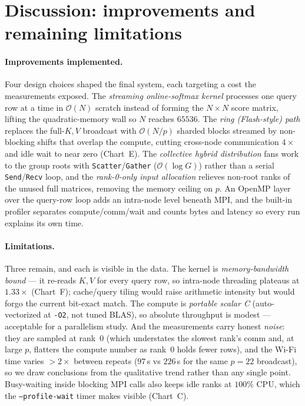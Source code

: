 \documentclass[11pt,a4paper]{article}
\newcommand{\code}[1]{\texttt{#1}}
\begin{document}
\section{Discussion: improvements and remaining limitations}
\label{sec:discussion}
\paragraph{Improvements implemented.} Four design choices shaped the final system,
each targeting a cost the measurements exposed. The \emph{streaming online-softmax
kernel} processes one query row at a time in $\mathcal{O}(N)$ scratch instead of
forming the $N\times N$ score matrix, lifting the quadratic-memory wall so $N$
reaches $65536$. The \emph{ring (Flash-style) path} replaces the full-$K,V$
broadcast with $\mathcal{O}(N/p)$ sharded blocks streamed by non-blocking shifts
that overlap the compute, cutting cross-node communication $4\times$ and idle wait
to near zero (Chart~E). The \emph{collective hybrid distribution} fans work to the
group roots with \code{Scatter}/\code{Gather} ($\mathcal{O}(\log G)$) rather than a
serial \code{Send}/\code{Recv} loop, and the \emph{rank-0-only input allocation}
relieves non-root ranks of the unused full matrices, removing the memory ceiling on
$p$. An OpenMP layer over the query-row loop adds an intra-node level beneath MPI,
and the built-in profiler separates compute/comm/wait and counts bytes and latency
so every run explains its own time.

\paragraph{Limitations.} Three remain, and each is visible in the data. The kernel
is \emph{memory-bandwidth bound} --- it re-reads $K,V$ for every query row, so
intra-node threading plateaus at $1.33\times$ (Chart~F); cache/query tiling would
raise arithmetic intensity but would forgo the current bit-exact match. The compute
is \emph{portable scalar C} (auto-vectorized at \code{-O2}, not tuned BLAS), so
absolute throughput is modest --- acceptable for a parallelism study. And the
measurements carry honest \emph{noise}: they are sampled at rank~0 (which understates
the slowest rank's comm and, at large $p$, flatters the compute number as rank~0
holds fewer rows), and the Wi-Fi time varies $>2\times$ between repeats
($97$\,s vs $226$\,s for the same $p{=}22$ broadcast), so we draw conclusions from
the qualitative trend rather than any single point. Busy-waiting inside blocking MPI
calls also keeps idle ranks at $100\%$ CPU, which the \code{--profile-wait} timer
makes visible (Chart~C).
\end{document}
